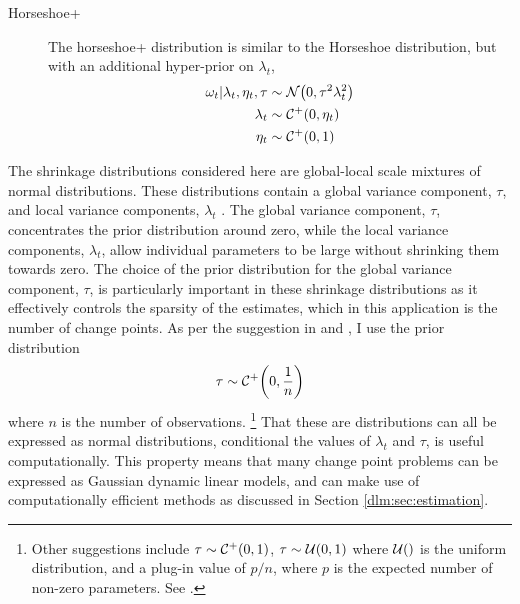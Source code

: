 \documentclass[12pt]{article}
\begin{document}
\begin{description}
\item[Horseshoe+] The horseshoe+ distribution \textcite{BhadraDattaPolsonEtAl2015a} is similar to the Horseshoe distribution, but with an additional hyper-prior on $\lambda_{t}$,
\begin{equation}
  \label{dlm:eq:15}
  \begin{aligned}[t]
    \omega_{t} | \lambda_{t}, \eta_{t}, \tau & \sim \mathcal{N}\mathopen{}\left(0, \tau^{2} \lambda_{t}^{2}\right)\mathclose{} \\
    \lambda_{t}  & \sim \mathcal{C^+}\mathopen{}\left(0, \eta_{t}\right)\mathclose{} \\
    \eta_{t} & \sim \mathcal{C^+}\mathopen{}\left(0, 1\right)\mathclose{} \\
  \end{aligned}
\end{equation}
\end{description}

The shrinkage distributions considered here are global-local scale mixtures of normal distributions.
These distributions contain a global variance component, $\tau$, and local variance components, $\lambda_{t}$ \parencite{PolsonScott2010}.
The global variance component, $\tau$, concentrates the prior distribution around zero, while the local variance components, $\lambda_{t}$, allow individual parameters to be large without shrinking them towards zero.
The choice of the prior distribution for the global variance component, $\tau$, is particularly important in these shrinkage distributions as it effectively controls the sparsity of the estimates, which in this application is the number of change points.
As per the suggestion in \textcite{BhadraDattaPolsonEtAl2015a} and \textcite{PasKleijnVaart2014a}, I use the prior distribution
\begin{equation}
  \tau \sim \mathcal{C^+}\mathopen{}\left(0, \frac{1}{n}\right)\mathclose{}
\end{equation}
where $n$ is the number of observations.
\footnote{
  Other suggestions include $\tau \sim \mathcal{C^+}\mathopen{}\left(0, 1\right)\mathclose{}$, $\tau \sim \mathcal{U}\mathopen{}\left(0, 1\right)\mathclose{}$ where $\mathcal{U}\mathopen{}\left(\right)\mathclose{}$ is the uniform distribution, and a plug-in value of $p / n$, where $p$ is the expected number of non-zero parameters. See \textcites{PolsonScott2012}{PasKleijnVaart2014a}{BhadraDattaPolsonEtAl2015a}.
}
That these are distributions can all be expressed as normal distributions, conditional the values of $\lambda_{t}$ and $\tau$, is useful computationally.
This property means that many change point problems can be expressed as Gaussian dynamic linear models, and can make use of computationally efficient methods as discussed in Section \ref{dlm:sec:estimation}.
\end{document}
